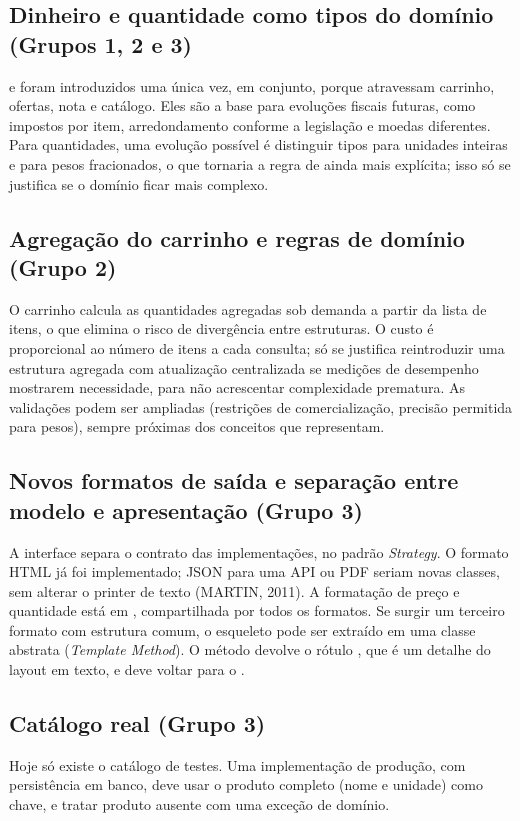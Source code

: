\subsection{Dinheiro e quantidade como tipos do domínio (Grupos 1, 2 e 3)}
 e  foram introduzidos uma única vez, em conjunto, porque atravessam carrinho, ofertas, nota e catálogo. Eles são a base para evoluções fiscais futuras, como impostos por item, arredondamento conforme a legislação e moedas diferentes. Para quantidades, uma evolução possível é distinguir tipos para unidades inteiras e para pesos fracionados, o que tornaria a regra de  ainda mais explícita; isso só se justifica se o domínio ficar mais complexo.

\subsection{Agregação do carrinho e regras de domínio (Grupo 2)}
O carrinho calcula as quantidades agregadas sob demanda a partir da lista de itens, o que elimina o risco de divergência entre estruturas. O custo é proporcional ao número de itens a cada consulta; só se justifica reintroduzir uma estrutura agregada com atualização centralizada se medições de desempenho mostrarem necessidade, para não acrescentar complexidade prematura. As validações podem ser ampliadas (restrições de comercialização, precisão permitida para pesos), sempre próximas dos conceitos que representam.

\subsection{Novos formatos de saída e separação entre modelo e apresentação (Grupo 3)}
A interface  separa o contrato das implementações, no padrão \textit{Strategy}. O formato HTML já foi implementado; JSON para uma API ou PDF seriam novas classes, sem alterar o printer de texto (MARTIN, 2011). A formatação de preço e quantidade está em , compartilhada por todos os formatos. Se surgir um terceiro formato com estrutura comum, o esqueleto pode ser extraído em uma classe abstrata (\textit{Template Method}). O método  devolve o rótulo , que é um detalhe do layout em texto, e deve voltar para o .

\subsection{Catálogo real (Grupo 3)}
Hoje só existe o catálogo de testes. Uma implementação de produção, com persistência em banco, deve usar o produto completo (nome e unidade) como chave, e tratar produto ausente com uma exceção de domínio.

